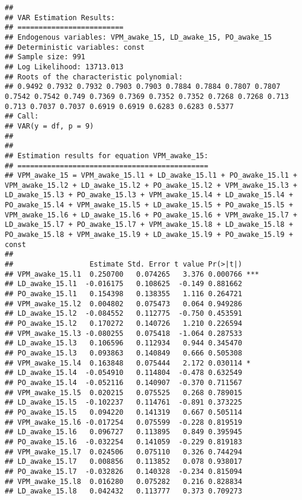 \documentclass[
]{article}
\begin{document}
\begin{verbatim}
## 
## VAR Estimation Results:
## ========================= 
## Endogenous variables: VPM_awake_15, LD_awake_15, PO_awake_15 
## Deterministic variables: const 
## Sample size: 991 
## Log Likelihood: 13713.013 
## Roots of the characteristic polynomial:
## 0.9492 0.7932 0.7932 0.7903 0.7903 0.7884 0.7884 0.7807 0.7807 0.7542 0.7542 0.749 0.7369 0.7369 0.7352 0.7352 0.7268 0.7268 0.713 0.713 0.7037 0.7037 0.6919 0.6919 0.6283 0.6283 0.5377
## Call:
## VAR(y = df, p = 9)
## 
## 
## Estimation results for equation VPM_awake_15: 
## ============================================= 
## VPM_awake_15 = VPM_awake_15.l1 + LD_awake_15.l1 + PO_awake_15.l1 + VPM_awake_15.l2 + LD_awake_15.l2 + PO_awake_15.l2 + VPM_awake_15.l3 + LD_awake_15.l3 + PO_awake_15.l3 + VPM_awake_15.l4 + LD_awake_15.l4 + PO_awake_15.l4 + VPM_awake_15.l5 + LD_awake_15.l5 + PO_awake_15.l5 + VPM_awake_15.l6 + LD_awake_15.l6 + PO_awake_15.l6 + VPM_awake_15.l7 + LD_awake_15.l7 + PO_awake_15.l7 + VPM_awake_15.l8 + LD_awake_15.l8 + PO_awake_15.l8 + VPM_awake_15.l9 + LD_awake_15.l9 + PO_awake_15.l9 + const 
## 
##                  Estimate Std. Error t value Pr(>|t|)    
## VPM_awake_15.l1  0.250700   0.074265   3.376 0.000766 ***
## LD_awake_15.l1  -0.016175   0.108625  -0.149 0.881662    
## PO_awake_15.l1   0.154398   0.138355   1.116 0.264721    
## VPM_awake_15.l2  0.004802   0.075473   0.064 0.949286    
## LD_awake_15.l2  -0.084552   0.112775  -0.750 0.453591    
## PO_awake_15.l2   0.170272   0.140726   1.210 0.226594    
## VPM_awake_15.l3 -0.080255   0.075418  -1.064 0.287533    
## LD_awake_15.l3   0.106596   0.112934   0.944 0.345470    
## PO_awake_15.l3   0.093863   0.140849   0.666 0.505308    
## VPM_awake_15.l4  0.163848   0.075444   2.172 0.030114 *  
## LD_awake_15.l4  -0.054910   0.114804  -0.478 0.632549    
## PO_awake_15.l4  -0.052116   0.140907  -0.370 0.711567    
## VPM_awake_15.l5  0.020215   0.075525   0.268 0.789015    
## LD_awake_15.l5  -0.102237   0.114761  -0.891 0.373225    
## PO_awake_15.l5   0.094220   0.141319   0.667 0.505114    
## VPM_awake_15.l6 -0.017254   0.075599  -0.228 0.819519    
## LD_awake_15.l6   0.096727   0.113895   0.849 0.395945    
## PO_awake_15.l6  -0.032254   0.141059  -0.229 0.819183    
## VPM_awake_15.l7  0.024506   0.075110   0.326 0.744294    
## LD_awake_15.l7   0.008856   0.113852   0.078 0.938017    
## PO_awake_15.l7  -0.032826   0.140328  -0.234 0.815094    
## VPM_awake_15.l8  0.016280   0.075282   0.216 0.828834    
## LD_awake_15.l8   0.042432   0.113777   0.373 0.709273    

\end{verbatim}
\end{document}
